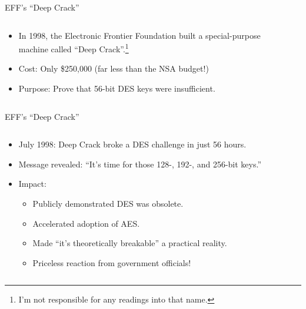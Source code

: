 \documentclass[aspectratio=169, lualatex, handout]{beamer}
\begin{document}
\begin{frame}{EFF's ``Deep Crack''}
	\begin{columns}[c]
		\begin{column}{0.6\textwidth}
			\begin{itemize}[<+->]
				\item In 1998, the Electronic Frontier Foundation built a special-purpose machine called ``Deep Crack''.\footnote{I'm not responsible for any readings into that name.}
				\item Cost: Only \$250,000 (far less than the NSA budget!)
				\item Purpose: Prove that 56-bit DES keys were insufficient.
			\end{itemize}
		\end{column}
		\begin{column}{0.4\textwidth}
		\end{column}
	\end{columns}
\end{frame}

\begin{frame}{EFF's ``Deep Crack''}
	\begin{columns}[c]
		\begin{column}{0.6\textwidth}
			\begin{itemize}[<+->]
				\item July 1998: Deep Crack broke a DES challenge in just 56 hours.
				\item Message revealed: ``It's time for those 128-, 192-, and 256-bit keys.''
				\item Impact:
				      \begin{itemize}
					      \item Publicly demonstrated DES was obsolete.
					      \item Accelerated adoption of AES.
					      \item Made ``it's theoretically breakable'' a practical reality.
					      \item Priceless reaction from government officials!
				      \end{itemize}
			\end{itemize}
		\end{column}
		\begin{column}{0.4\textwidth}
		\end{column}
	\end{columns}
\end{frame}
\end{document}
